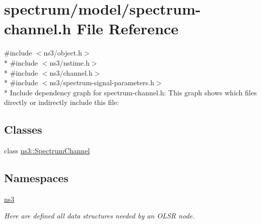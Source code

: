 \hypertarget{spectrum-channel_8h}{}\section{spectrum/model/spectrum-\/channel.h File Reference}
\label{spectrum-channel_8h}
{\ttfamily \#include $<$ns3/object.\+h$>$}\\*
{\ttfamily \#include $<$ns3/nstime.\+h$>$}\\*
{\ttfamily \#include $<$ns3/channel.\+h$>$}\\*
{\ttfamily \#include $<$ns3/spectrum-\/signal-\/parameters.\+h$>$}\\*
Include dependency graph for spectrum-\/channel.h\+:
This graph shows which files directly or indirectly include this file\+:
\subsection*{Classes}
\begin{DoxyCompactItemize}
\item 
class \hyperlink{classns3_1_1SpectrumChannel}{ns3\+::\+Spectrum\+Channel}
\end{DoxyCompactItemize}
\subsection*{Namespaces}
\begin{DoxyCompactItemize}
\item 
 \hyperlink{namespacens3}{ns3}
\begin{DoxyCompactList}\small\item\em Here are defined all data structures needed by an O\+L\+SR node. \end{DoxyCompactList}\end{DoxyCompactItemize}
